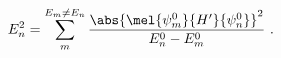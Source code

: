 
\begin{issues}
\issueDraft
\end{issues}

\begin{equation}
E_n^2 = \sum_{m}^{E_m\ne E_n} \frac{\abs{\mel{\psi_m^0}{H'}{\psi_n^0}}^2}{E_n^0-E_m^0}~.
\end{equation}
